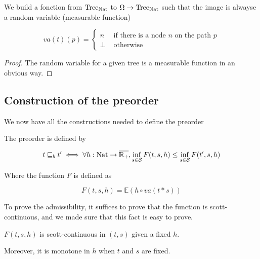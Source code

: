 \begin{adefinition}
    We build a fonction from $\textnormal{Tree}_{\textnormal{Nat}}$ to $\Omega \to \textnormal{Tree}_{\textnormal{Nat}}$
    such that the image is alwayse a random variable (measurable function)

    \begin{equation*}
        va(t)(p) = \begin{cases}
            n  & \text{ if there is a node } n \text{ on the path } p \\
            \bot & \text{ otherwise } 
        \end{cases}
    \end{equation*}
\end{adefinition}

\begin{proof}
    The random variable for a given tree is a measurable function 
    in an obvious way.
\end{proof}

\subsection{Construction of the preorder}

We now have all the constructions needed to define the preorder

\begin{adefinition}[Preorder]
    The preorder is defined by

    \begin{equation*}
        t \sqsubseteq_b t' \iff \forall h : \textnormal{Nat} \to \overline{\mathbb{R}_+}, 
        \inf_{ s \in \mathcal{S}} F (t,s,h) \leq \inf_{s \in \mathcal{S}} F (t',s,h)
    \end{equation*}

    Where the function $F$ is defined as 

    \begin{equation*}
        F(t,s,h) = \mathbb{E}(h \circ va(t * s))
    \end{equation*}
\end{adefinition}

To prove the admissibility, it suffices to prove that the function 
is scott-continuous, and we made sure that this fact is easy to prove.

\begin{alemma}
    $F(t,s,h)$ is scott-continuous 
    in $(t,s)$ given a fixed $h$.

    Moreover, it is monotone in $h$ 
    when $t$ and $s$ are fixed.
\end{alemma}

